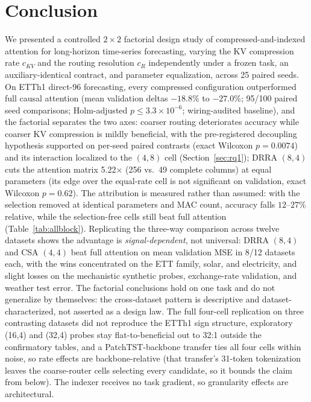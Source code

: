\section{Conclusion}
\label{sec:conclusion}

We presented a controlled $2\times2$ factorial design study of
compressed-and-indexed attention for long-horizon time-series forecasting,
varying the KV compression rate $c_{KV}$ and the routing resolution $c_R$
independently under a frozen task, an auxiliary-identical contract, and
parameter equalization, across 25 paired seeds. On ETTh1 direct-96
forecasting, every compressed configuration outperformed full causal
attention (mean validation deltas $-18.8\%$ to $-27.0\%$; 95/100 paired
seed comparisons; Holm-adjusted $p \le 3.3\times10^{-6}$;
wiring-audited baseline), and the factorial separates the two axes:
coarser routing deteriorates accuracy while coarser KV compression is
mildly beneficial, with the pre-registered decoupling hypothesis supported
on per-seed paired contrasts (exact Wilcoxon $p = 0.0074$) and its interaction
localized to the $(4,8)$ cell (Section~\ref{sec:rq1}); DRRA
$(8,4)$ cuts the attention matrix 5.22$\times$ (256 vs.\ 49 complete columns) at equal parameters (its
edge over the equal-rate cell is not significant on validation, exact Wilcoxon $p = 0.62$).
The attribution is measured rather than assumed: with the selection removed at
identical parameters and MAC count, accuracy falls $12$--$27\%$ relative, while the
selection-free cells still beat full attention
(Table~\ref{tab:allblock}).
Replicating the three-way comparison across twelve datasets shows the
advantage is \emph{signal-dependent}, not universal: DRRA $(8,4)$ and CSA $(4,4)$ beat
full attention on mean validation MSE in 8/12 datasets each, with the wins concentrated on the ETT family, solar, and
electricity, and slight losses on the mechanistic synthetic probes,
exchange-rate validation, and weather test error. The factorial conclusions
hold on one task and do not generalize by themselves: the cross-dataset pattern
is descriptive and dataset-characterized, not asserted as a design law. The full four-cell replication on three contrasting datasets did not reproduce the ETTh1 sign structure, exploratory (16,4) and (32,4) probes stay flat-to-beneficial out to 32:1 outside the confirmatory tables, and a PatchTST-backbone transfer ties all four cells within noise, so rate effects are backbone-relative (that transfer's 31-token tokenization leaves the coarse-router cells selecting every candidate, so it bounds the claim from below). The indexer receives no task gradient, so granularity effects are architectural.


